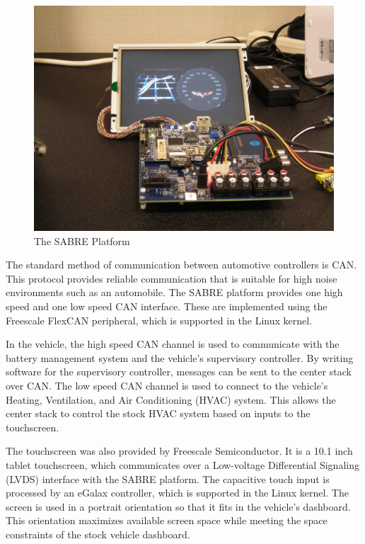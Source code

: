 \documentclass[ece]{uw-wkrpt}
\begin{document}
\begin{figure}
    \centering
    \includegraphics[width=6in]{sabre}
    \caption[The SABRE Platform]{The SABRE Platform}
    \label{ref:sabre}
\end{figure}

The standard method of communication between automotive controllers is CAN. This
protocol provides reliable communication that is suitable for high noise
environments such as an automobile. The SABRE platform provides one high speed
and one low speed CAN interface. These are implemented using the Freescale
FlexCAN peripheral, which is supported in the Linux kernel.

In the vehicle, the high speed CAN channel is used to communicate with the
battery management system and the vehicle's supervisory controller. By writing
software for the supervisory controller, messages can be sent to the center
stack over CAN. The low speed CAN channel is used to connect to the vehicle's
Heating, Ventilation, and Air Conditioning (HVAC) system. This allows the center
stack to control the stock HVAC system based on inputs to the touchscreen.

The touchscreen was also provided by Freescale Semiconductor. It is a 10.1 inch
tablet touchscreen, which communicates over a Low-voltage Differential Signaling
(LVDS) interface with the SABRE platform. The capacitive touch input is
processed by an eGalax controller, which is supported in the Linux kernel. The
screen is used in a portrait orientation so that it fits in the vehicle's
dashboard. This orientation maximizes available screen space while meeting the
space constraints of the stock vehicle dashboard.
\end{document}
